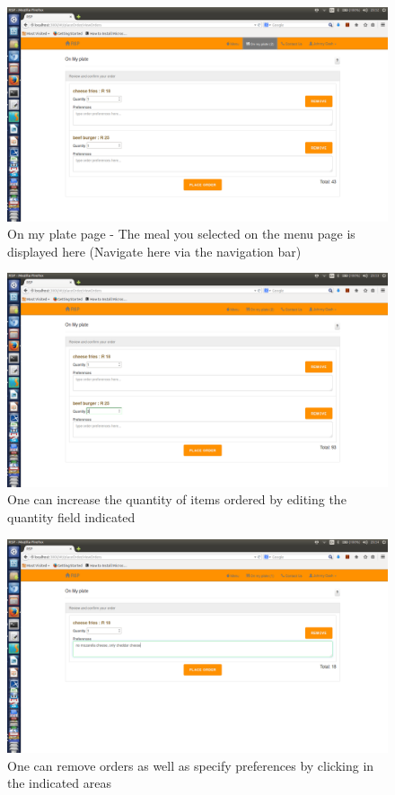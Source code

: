 \documentclass[a4paper,12pt]{report}
\begin{document}
\begin{figure}[H]
  \centering
    \includegraphics[width=1.0\textwidth]{screenshots/viewOrder1.png}
    \caption{On my plate page - The meal you selected on the menu page is displayed here (Navigate here via the navigation bar)} 
\end{figure}
\begin{figure}[H]
  \centering
    \includegraphics[width=1.0\textwidth]{screenshots/viewOrder2.png}
    \caption{One can increase the quantity of items ordered by editing the quantity field indicated} 
\end{figure}
\begin{figure}[H]
  \centering
    \includegraphics[width=1.0\textwidth]{screenshots/viewOrder3.png}
    \caption{One can remove orders as well as specify preferences by clicking in the indicated areas} 
\end{figure}
\end{document}
